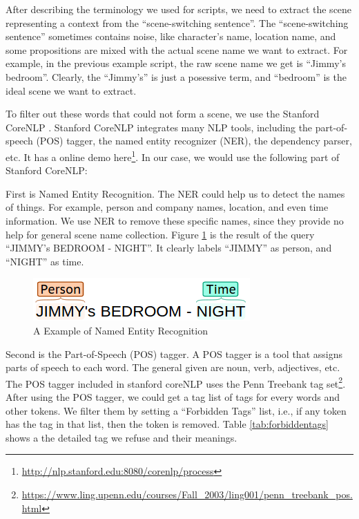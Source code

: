 After describing the terminology we used for scripts, we need to extract the scene representing a context from the ``scene-switching sentence''. 
The ``scene-switching sentence'' sometimes contains noise, like character's name, location name, and some propositions are mixed with the actual scene name we want to extract. 
For example, in the previous example script, the raw scene name we get is ``Jimmy's bedroom''. 
Clearly, the ``Jimmy's'' is just a posessive term, and ``bedroom'' is the ideal scene we want to extract. 

To filter out these words that could not form a scene, we use the Stanford CoreNLP \cite{manning2014corenlp}. 
Stanford CoreNLP integrates many NLP tools, including the part-of-speech (POS) tagger, the named entity recognizer (NER), the dependency parser, etc. 
It has a online demo here\footnote{\url{http://nlp.stanford.edu:8080/corenlp/process}}. 
In our case, we would use the following part of Stanford CoreNLP:
 
First is Named Entity Recognition. The NER could help us to detect the names of things. For example, person and company names, location, and even time information. 
We use NER to remove these specific names, since they provide no help for general scene name collection. 
Figure \ref{fig:ner} is the result of the query ``JIMMY's BEDROOM - NIGHT''. 
It clearly labels ``JIMMY'' as person, and ``NIGHT'' as time. 
\begin{figure}[htb]
\centering
\includegraphics[scale=0.6]{figure/dataprep/ner}
\caption{A Example of Named Entity Recognition}
\label{fig:ner}
\end{figure}

Second is the Part-of-Speech (POS) tagger. A POS tagger is a tool that assigns parts of speech to each word. 
The general given are noun, verb, adjectives, etc.  
The POS tagger included in stanford coreNLP uses the Penn Treebank tag set\footnote{\url{https://www.ling.upenn.edu/courses/Fall\_2003/ling001/penn\_treebank\_pos.html}}.  
After using the POS tagger, we could get a tag list of tags for every words and other tokens. 
We filter them by setting a ``Forbidden Tags'' list, i.e., if any token has the tag in that list, then the token is removed.  
Table \ref{tab:forbiddentags} shows a the detailed tag we refuse and their meanings. 

